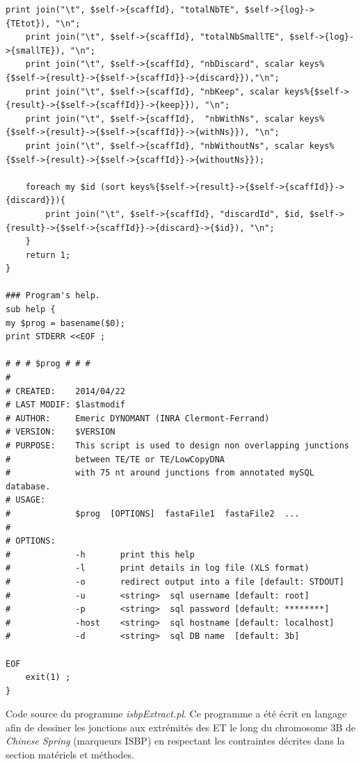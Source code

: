 \documentclass[a4paper, 12pt]{article}
\begin{document}
\begin{onehalfspace}
\begin{lstlisting}[frame=single]
	print join("\t", $self->{scaffId}, "totalNbTE", $self->{log}->{TEtot}), "\n";
	print join("\t", $self->{scaffId}, "totalNbSmallTE", $self->{log}->{smallTE}), "\n";
	print join("\t", $self->{scaffId}, "nbDiscard", scalar keys%{$self->{result}->{$self->{scaffId}}->{discard}}),"\n";
	print join("\t", $self->{scaffId}, "nbKeep", scalar keys%{$self->{result}->{$self->{scaffId}}->{keep}}), "\n";
	print join("\t", $self->{scaffId},  "nbWithNs", scalar keys%{$self->{result}->{$self->{scaffId}}->{withNs}}), "\n";
	print join("\t", $self->{scaffId}, "nbWithoutNs", scalar keys%{$self->{result}->{$self->{scaffId}}->{withoutNs}});

	foreach my $id (sort keys%{$self->{result}->{$self->{scaffId}}->{discard}}){
		print join("\t", $self->{scaffId}, "discardId", $id, $self->{result}->{$self->{scaffId}}->{discard}->{$id}), "\n";
	}
	return 1;
}

### Program's help.
sub help {
my $prog = basename($0);
print STDERR <<EOF ;

# # # $prog # # #
#
# CREATED:    2014/04/22
# LAST MODIF: $lastmodif
# AUTHOR:     Emeric DYNOMANT (INRA Clermont-Ferrand)
# VERSION:    $VERSION
# PURPOSE:    This script is used to design non overlapping junctions 
#             between TE/TE or TE/LowCopyDNA
#             with 75 nt around junctions from annotated mySQL database.
# USAGE:
#             $prog  [OPTIONS]  fastaFile1  fastaFile2  ...
#
# OPTIONS:
#             -h       print this help
#             -l       print details in log file (XLS format)
#             -o       redirect output into a file [default: STDOUT]
#             -u       <string>  sql username [default: root]
#             -p       <string>  sql password [default: ********]
#             -host    <string>  sql hostname [default: localhost]
#             -d       <string>  sql DB name  [default: 3b]

EOF
	exit(1) ;
}
\end{lstlisting}

\vspace{1cm}
Code source du programme \textit{isbpExtract.pl}. Ce programme a été écrit en langage  afin de dessiner les jonctions aux extrémités des ET le long du chromosome 3B de \textit{Chinese Spring} (marqueurs ISBP) en respectant les contraintes décrites dans la section matériels et méthodes.\\

\thispagestyle{empty}
\end{onehalfspace}
\end{document}
